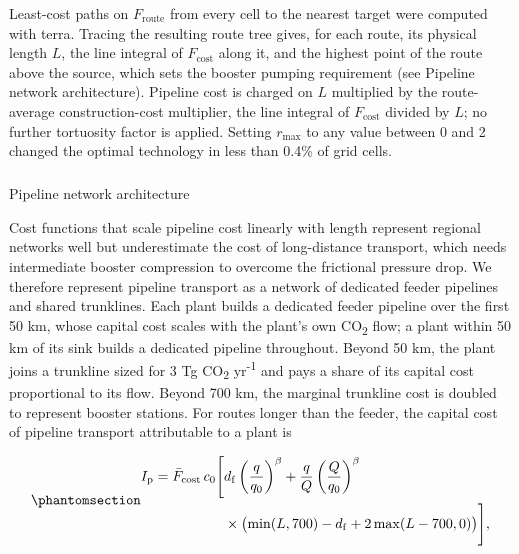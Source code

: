 \documentclass[
  letterpaper,
  twoside,
  twocolumn,
  9pt]{article}
\makeatletter
\let\oldsubparagraph\subparagraph
\renewcommand{\subparagraph}{
    \@ifstar
      \xxxSubParagraphStar
      \xxxSubParagraphNoStar
  }
\newcommand{\xxxSubParagraphStar}[1]{\oldsubparagraph*{#1}\mbox{}}
\newcommand{\xxxSubParagraphNoStar}[1]{\oldsubparagraph{#1}\mbox{}}
\makeatother
\begin{document}
Least-cost paths on \(F_{\mathrm{route}}\) from every cell to the
nearest target were computed with terra.\citep{hijmans2025terra} Tracing
the resulting route tree gives, for each route, its physical length
\(L\), the line integral of \(F_{\mathrm{cost}}\) along it, and the
highest point of the route above the source, which sets the booster
pumping requirement (see Pipeline network architecture). Pipeline cost
is charged on \(L\) multiplied by the route-average construction-cost
multiplier, the line integral of \(F_{\mathrm{cost}}\) divided by \(L\);
no further tortuosity factor is applied. Setting \(r_{\max}\) to any
value between 0 and 2 changed the optimal technology in less than 0.4\%
of grid cells.

\subparagraph{Pipeline network
architecture}\label{pipeline-network-architecture}

Cost functions that scale pipeline cost linearly with length represent
regional networks well but underestimate the cost of long-distance
transport, which needs intermediate booster compression to overcome the
frictional pressure drop. We therefore represent pipeline transport as a
network of dedicated feeder pipelines and shared trunklines. Each plant
builds a dedicated feeder pipeline over the first 50 km, whose capital
cost scales with the plant's own CO\textsubscript{2} flow; a plant
within 50 km of its sink builds a dedicated pipeline throughout. Beyond
50 km, the plant joins a trunkline sized for 3 Tg CO\textsubscript{2}
yr\textsuperscript{-1} and pays a share of its capital cost proportional
to its flow. Beyond 700 km, the marginal trunkline cost is doubled to
represent booster stations. For routes longer than the feeder, the
capital cost of pipeline transport attributable to a plant is

\begin{equation}\phantomsection\label{eq-trunk}{\begin{aligned}
I_{\mathrm{p}} = \bar{F}_{\mathrm{cost}}\, c_0 \Biggl[ & d_{\mathrm{f}} \left( \frac{q}{q_0} \right)^{\beta} + \frac{q}{Q} \left( \frac{Q}{q_0} \right)^{\beta} \\
& \times \bigl( \min(L, 700) - d_{\mathrm{f}} + 2 \max(L - 700, 0) \bigr) \Biggr],
\end{aligned}}\end{equation}
\end{document}
